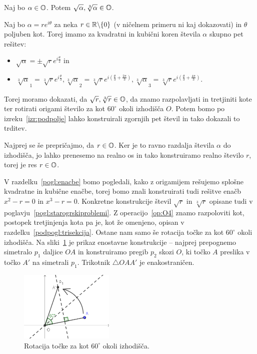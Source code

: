 \begin{trditev}
    \label{trd:zaprtost_koren}
    Naj bo $\alpha \in \mathbb O$. Potem $\sqrt{\alpha}, \sqrt[3]{\alpha} \in \mathbb O$.
\end{trditev}

\begin{dokaz}
    Naj bo $\alpha = r e^{i \theta}$ za neka $r \in \mathbb R \backslash \{0\}$ (v ničelnem primeru ni kaj dokazovati) in $\theta$ poljuben kot. Torej imamo za kvadratni in kubični koren števila $\alpha$ skupno pet rešitev:
    \begin{itemize}
        \item $\sqrt{\alpha} = \pm \sqrt{r}e^{i \frac{\theta}{2}}$ in
        \item $\sqrt[3]{\alpha}_1 = \sqrt[3]{r}e^{i \frac{\theta}{3}}, \sqrt[3]{\alpha}_2 = \sqrt[3]{r}e^{i \left(\frac{\theta}{3} + \frac{2\pi}{3}\right)}, \sqrt[3]{\alpha}_3 = \sqrt[3]{r}e^{i \left(\frac{\theta}{3} + \frac{4\pi}{3}\right)}$.
    \end{itemize}
    Torej moramo dokazati, da $\sqrt{r}, \sqrt[3]{r} \in \mathbb O$, da znamo razpolavljati in tretjiniti kote ter rotirati origami število za kot $60^\circ$ okoli izhodišča $O$. Potem bomo po izreku~\ref{izr:podpolje} lahko konstruirali zgornjih pet števil in tako dokazali to trditev.

    Najprej se še prepričajmo, da $r \in \mathbb O$. Ker je to ravno razdalja števila $\alpha$ do izhodišča, jo lahko prenesemo na realno os in tako konstruiramo realno število $r$, torej je res $r \in \mathbb O$.
    
    V razdelku~\ref{pogl:enacbe} bomo pogledali, kako z origamijem rešujemo splošne kvadratne in kubične enačbe, torej bomo znali konstruirati tudi rešitve enačb $x^2 - r = 0$ in $x^3 - r = 0$. Konkretne konstrukcije števil $\sqrt{r}$ in $\sqrt[3]{r}$ opisane tudi v poglavju~\ref{pogl:starogrskiproblemi}. Z operacijo~\ref{op:O4} znamo razpoloviti kot, postopek tretjinjenja kota pa je, kot že omenjeno, opisan v razdelku~\ref{podpogl:trisekcija}. Ostane nam samo še rotacija točke za kot $60^\circ$ okoli izhodišča. Na sliki~\ref{fig:kot60_rotacija} je prikaz enostavne konstrukcije -- najprej prepognemo simetralo $p_1$ daljice $OA$ in konstruiramo pregib $p_2$ skozi $O$, ki točko $A$ preslika v točko $A'$ na simetrali $p_1$. Trikotnik $\triangle OAA'$ je enakostraničen. 
    \begin{figure}[h]
        \centering
        \includegraphics[width=0.4\textwidth]{images/algebra/kot60.png}
        \caption[Rotacija točke okoli izhodišča]{Rotacija točke za kot $60^\circ$ okoli izhodišča.}
        \label{fig:kot60_rotacija}
    \end{figure}
\end{dokaz}


